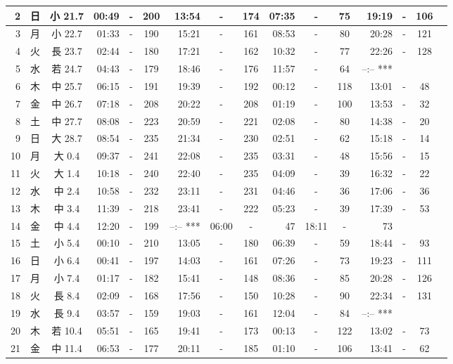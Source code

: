 \documentclass[12pt.a4j]{jsarticle}
\begin{document}
\begin{center}
\begin{table}[ht]
\begin{tabular}{|rc|cr|ccrccr|ccrccr|}
\hline
 2 & 日 & 小 21.7 & 00:49 &-& 200 & 13:54 &-& 174 & 07:35 &-&  75 & 19:19 &-& 106 \\
\hline
 3 & 月 & 小 22.7 & 01:33 &-& 190 & 15:21 &-& 161 & 08:53 &-&  80 & 20:28 &-& 121 \\
\hline
 4 & 火 & 長 23.7 & 02:44 &-& 180 & 17:21 &-& 162 & 10:32 &-&  77 & 22:26 &-& 128 \\
\hline
 5 & 水 & 若 24.7 & 04:43 &-& 179 & 18:46 &-& 176 & 11:57 &-&  64 & --:--   *** \\
\hline
 6 & 木 & 中 25.7 & 06:15 &-& 191 & 19:39 &-& 192 & 00:12 &-& 118 & 13:01 &-&  48 \\
\hline
 7 & 金 & 中 26.7 & 07:18 &-& 208 & 20:22 &-& 208 & 01:19 &-& 100 & 13:53 &-&  32 \\
\hline
 8 & 土 & 中 27.7 & 08:08 &-& 223 & 20:59 &-& 221 & 02:08 &-&  80 & 14:38 &-&  20 \\
\hline
 9 & 日 & 大 28.7 & 08:54 &-& 235 & 21:34 &-& 230 & 02:51 &-&  62 & 15:18 &-&  14 \\
\hline
10 & 月 & 大  0.4 & 09:37 &-& 241 & 22:08 &-& 235 & 03:31 &-&  48 & 15:56 &-&  15 \\
\hline
11 & 火 & 大  1.4 & 10:18 &-& 240 & 22:40 &-& 235 & 04:09 &-&  39 & 16:32 &-&  22 \\
\hline
12 & 水 & 中  2.4 & 10:58 &-& 232 & 23:11 &-& 231 & 04:46 &-&  36 & 17:06 &-&  36 \\
\hline
13 & 木 & 中  3.4 & 11:39 &-& 218 & 23:41 &-& 222 & 05:23 &-&  39 & 17:39 &-&  53 \\
\hline
14 & 金 & 中  4.4 & 12:20 &-& 199 & --:--   *** & 06:00 &-&  47 & 18:11 &-&  73 \\
\hline
15 & 土 & 小  5.4 & 00:10 &-& 210 & 13:05 &-& 180 & 06:39 &-&  59 & 18:44 &-&  93 \\
\hline
16 & 日 & 小  6.4 & 00:41 &-& 197 & 14:03 &-& 161 & 07:26 &-&  73 & 19:23 &-& 111 \\
\hline
17 & 月 & 小  7.4 & 01:17 &-& 182 & 15:41 &-& 148 & 08:36 &-&  85 & 20:28 &-& 126 \\
\hline
18 & 火 & 長  8.4 & 02:09 &-& 168 & 17:56 &-& 150 & 10:28 &-&  90 & 22:34 &-& 131 \\
\hline
19 & 水 & 長  9.4 & 03:57 &-& 159 & 19:03 &-& 161 & 12:04 &-&  84 & --:--   *** \\
\hline
20 & 木 & 若 10.4 & 05:51 &-& 165 & 19:41 &-& 173 & 00:13 &-& 122 & 13:02 &-&  73 \\
\hline
21 & 金 & 中 11.4 & 06:53 &-& 177 & 20:11 &-& 185 & 01:10 &-& 106 & 13:41 &-&  62 \\

\end{tabular}
\end{table}
\end{center}
\end{document}
